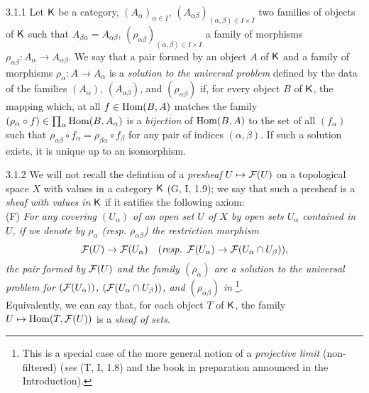 \documentclass[../main.tex]{subfiles}
\begin{document}
\begin{env}{3.1.1}
Let $\mathsf{K}$ be a category, $(A_\alpha)_{\alpha\in I}$,
$(A_{\alpha\beta})_{(\alpha,\beta)\in I\times I}$ two families of objects
of $\mathsf{K}$ such that $A_{\beta\alpha}=A_{\alpha\beta}$,
$(\rho_{\alpha\beta})_{(\alpha,\beta)\in I\times I}$ a family of morphisms
$\rho_{\alpha\beta}\colon A_\alpha\to A_{\alpha\beta}$. We say that a pair formed by
an object $A$ of $\mathsf{K}$ and a family of morphisms $\rho_\alpha\colon A\to A_\alpha$ 
is a \emph{solution to the universal problem} defined by the data of the families
$(A_\alpha)$, $(A_{\alpha\beta})$, and $(\rho_{\alpha\beta})$ if, for every object $B$
of $\mathsf{K}$, the mapping which, at all $f\in\operatorname{Hom}(B,A)$ matches the
family $(\rho_\alpha\circ f)\in\prod_\alpha\operatorname{Hom}(B,A_\alpha)$ is a \emph{bijection}
of $\operatorname{Hom}(B,A)$ to the set of all $(f_\alpha)$ such that
$\rho_{\alpha\beta}\circ f_\alpha=\rho_{\beta\alpha}\circ f_\beta$ for any pair of
indices $(\alpha,\beta)$. If such a solution exists, it is unique up to an isomorphism.
\end{env}

\begin{env}{3.1.2}
We will not recall the defintion of a \emph{presheaf} $U\mapsto\mathcal{F}(U)$ on a
topological space $X$ with values in a category $\mathsf{K}$ (G, I, 1.9); we say that
such a presheaf is a \emph{sheaf with values in} $\mathsf{K}$ if it satifies the following
axiom:\\

(F) \emph{For any covering $(U_\alpha)$ of an open set $U$ of $X$ by open sets
   $U_\alpha$ contained in $U$, if we denote by $\rho_\alpha$ (resp. $\rho_{\alpha\beta}$) the
   restriction morphism}
   \[
     \mathcal{F}(U)\to\mathcal{F}(U_\alpha)\quad(\text{\emph{resp. }}\mathcal{F}(U_\alpha)\to\mathcal{F}(U_\alpha\cap U_\beta)),
   \]
   \emph{the pair formed by $\mathcal{F}(U)$ and the family $(\rho_\alpha)$ are a solution to
   the universal problem for $(\mathcal{F}(U_\alpha))$, $(\mathcal{F}(U_\alpha\cap U_\beta))$, and $(\rho_{\alpha\beta})$
   in} \footnote{This is a special case of the more general notion of a
   \emph{projective limit} (non-filtered) (\emph{see} (T, I, 1.8) and the book in
   preparation announced in the Introduction).}.\\

Equivalently, we can say that, for each object $T$ of $\mathsf{K}$, the family
$U\mapsto\operatorname{Hom}(T,\mathcal{F}(U))$ is a \emph{sheaf of sets}.
\end{env}
\end{document}
